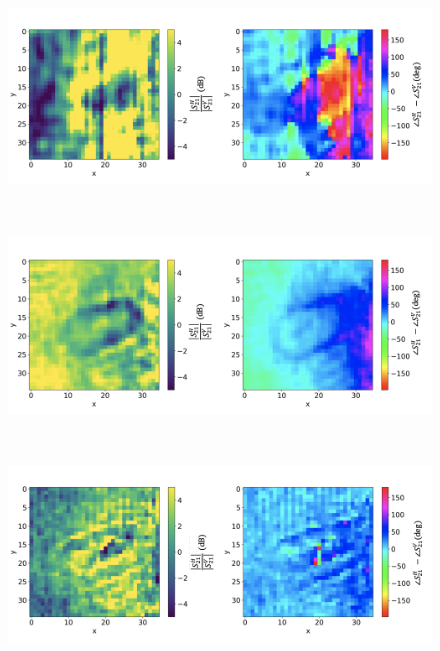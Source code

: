 \documentclass[11pt,a4paper,uplatex]{ujarticle}
\begin{document}
  \begin{figure}[tbp]
    \begin{minipage}[b]{0.995\textwidth}
      \centering
      \includegraphics[keepaspectratio, width=130mm]{Images/python/yokonarabe/diff/processed/50.png}
    \end{minipage}\\
    \begin{minipage}[b]{0.995\textwidth}
      \centering
      \includegraphics[keepaspectratio, width=130mm]{Images/python/yokonarabe/diff/processed/90.png}
    \end{minipage}\\
    \begin{minipage}[b]{0.995\textwidth}
      \centering
      \includegraphics[keepaspectratio, width=130mm]{Images/python/yokonarabe/diff/processed/130.png}
    \end{minipage}\\

\end{figure}
\end{document}
